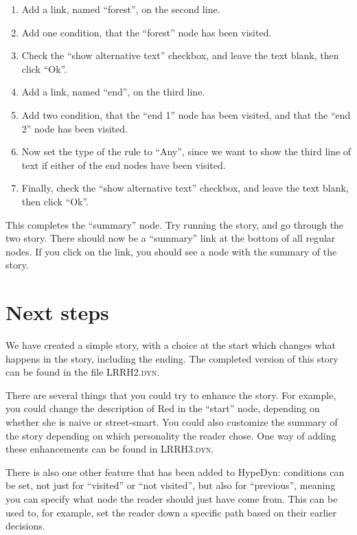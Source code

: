 \documentclass{article}
\begin{document}
\begin{enumerate}
  \item Add a link, named ``forest'', on the second line.
  \item Add one condition, that the ``forest'' node has been visited.
  \item Check the ``show alternative text'' checkbox, and leave the text blank,
  then click ``Ok''.
  \item Add a link, named ``end'', on the third line.
  \item Add two condition, that the ``end 1'' node has been visited, and that
  the ``end 2'' node has been visited.
  \item Now set the type of the rule to ``Any'', since we want to show the
  third line of text if either of the end nodes have been visited.
  \item Finally, check the ``show alternative text'' checkbox, and leave the
  text blank, then click ``Ok''.
\end{enumerate}

This completes the ``summary'' node. Try running the story, and go through
the two story. There should now be a ``summary'' link at the bottom of all
regular nodes. If you click on the link, you should see a node with the summary
of the story.

\section{Next steps}

We have created a simple story, with a choice at the start which changes what
happens in the story, including the ending. The completed version of this story
can be found in the file \textsc{LRRH2.dyn}.

There are several things that you could try to enhance the story. For example,
you could change the description of Red in the ``start'' node, depending on
whether she is naive or street-smart. You could also customize the summary of
the story depending on which personality the reader chose. One way of adding
these enhancements can be found in \textsc{LRRH3.dyn}.

There is also one other feature that has been added to HypeDyn: conditions can
be set, not just for ``visited'' or ``not visited'', but also for ``previous'',
meaning you can specify what node the reader should just have come from. This
can be used to, for example, set the reader down a specific path based on their
earlier decisions.
\end{document}
